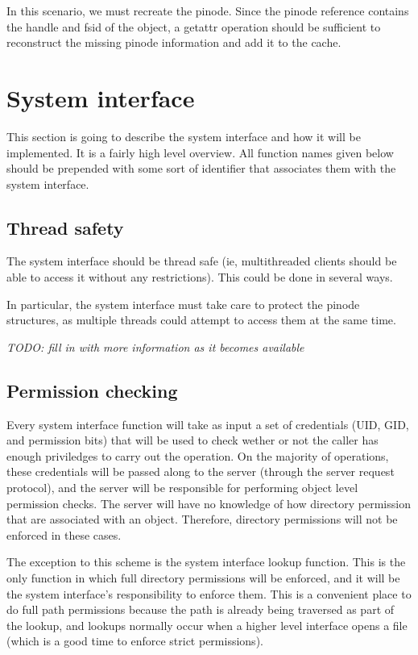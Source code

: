 \documentclass[11pt, letterpaper]{article}
\begin{document}
In this scenario, we must recreate the pinode.  Since the pinode
reference contains the handle and fsid of the object, a getattr
operation should be sufficient to reconstruct the missing pinode
information and add it to the cache.

\section{System interface}

This section is going to describe the system interface and how it will
be implemented.  It is a fairly high level overview.  All function names given
below should be
prepended with some sort of identifier that associates them with the
system interface. 

\subsection{Thread safety}

The system interface should be thread safe (ie, multithreaded clients
should be able to access it without any restrictions).  This could be
done in several ways.  

In particular, the system interface must take care to protect
the pinode structures, as multiple threads could attempt to access them
at the same time.  

\emph{TODO: fill in with more information as it becomes available}

\subsection{Permission checking}
\label{sec:permission}

Every system interface function will take as input a set of credentials
(UID, GID, and permission bits) that will be used to check wether or not the
caller has enough priviledges to carry out the operation.  On the
majority of operations, these credentials will be passed along to the
server (through the server request protocol), and the server will
be responsible for performing object level permission checks.  
The server will have no knowledge of how directory permission that are 
associated with an object.  Therefore, directory permissions will not be
enforced in these cases.

The exception to this scheme is the system interface lookup function.
This is the only function in which full directory permissions will be
enforced, and it will be the system interface's responsibility to
enforce them.  This is a convenient place to do full path permissions
because the path is already being traversed as part of the lookup, and
lookups normally occur when a higher level interface opens a file (which
is a good time to enforce strict permissions).
\end{document}
